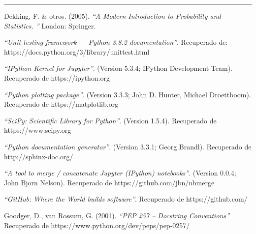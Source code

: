\documentclass[11pt]{article}
\begin{document}
\noindent\rule{\textwidth}{1pt}

\begin{thebibliography}{9}
Dekking, F. \& otros. (2005). 
\textit{``A Modern Introduction to Probability and Statistics. ''}
London: Springer.

\textit{``Unit testing framework — Python 3.8.2 documentation''}.
 Recuperado de: https://docs.python.org/3/library/unittest.html

 \textit{``IPython Kernel for Jupyter''}.
 (Version 5.3.4; IPython Development Team).
 Recuperado de https://ipython.org

 \textit{``Python plotting package''}.
 (Version 3.3.3; John D. Hunter, Michael Droettboom).
 Recuperado de https://matplotlib.org

 \textit{``SciPy: Scientific Library for Python''}.
 (Version 1.5.4).
 Recuperado de https://www.scipy.org

 \textit{``Python documentation generator''}.
 (Version 3.3.1; Georg Brandl).
 Recuperado de http://sphinx-doc.org/

 \textit{``A tool to merge / concatenate Jupyter (IPython) notebooks''}.
 (Version 0.0.4; John Bjorn Nelson).
 Recuperado de https://github.com/jbn/nbmerge

 \textit{``GitHub: Where the World builds software''}.
  Recuperado de https://github.com/

 Goodger, D., van Rossum, G. (2001).
 \textit{``PEP 257 -- Docstring Conventions''}
 Recuperado de https://www.python.org/dev/peps/pep-0257/

\end{thebibliography}
    
\end{document}
